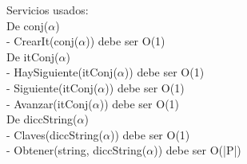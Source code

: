 Servicios usados: \\

De conj($\alpha$) \\
- CrearIt(conj($\alpha$)) debe ser O(1) \\

De itConj($\alpha$) \\
- HaySiguiente(itConj($\alpha$)) debe ser O(1) \\
- Siguiente(itConj($\alpha$)) debe ser O(1) \\
- Avanzar(itConj($\alpha$)) debe ser O(1) \\

De diccString($\alpha$) \\
- Claves(diccString($\alpha$)) debe ser O(1) \\
- Obtener(string, diccString($\alpha$)) debe ser O(|P|) \\

